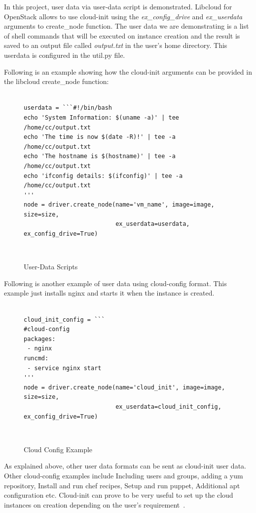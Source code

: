 In this project, user data via user-data script is demonstrated. Libcloud for
OpenStack allows to use cloud-init using the \textit{ex\_config\_drive} and
\textit{ex\_userdata} arguments to create\_node function. The user data we are
demonstrating is a list of shell commands that will be executed on instance
creation and the result is saved to an output file called \textit{output.txt} 
in the user's home directory. This userdata is configured in the util.py file.

Following is an example showing how the cloud-init arguments can be provided 
in the libcloud create\_node function:

\begin{figure}[htb]
\begin{verbatim}

userdata = ```#!/bin/bash
echo 'System Information: $(uname -a)' | tee /home/cc/output.txt
echo 'The time is now $(date -R)!' | tee -a /home/cc/output.txt
echo 'The hostname is $(hostname)' | tee -a /home/cc/output.txt
echo 'ifconfig details: $(ifconfig)' | tee -a /home/cc/output.txt
'''
node = driver.create_node(name='vm_name', image=image, size=size,
                          ex_userdata=userdata, ex_config_drive=True)
\end{verbatim}
\caption{User-Data Scripts}
~\cite{hid-sp18-516-www-cloud-init}\label{c:cloud-init-example1}
\end{figure}

Following is another example of user data using cloud-config format. This
example just installs nginx and starts it when the instance is created.

\begin{figure}[htb]
\begin{verbatim}

cloud_init_config = ```
#cloud-config
packages:
 - nginx
runcmd:
 - service nginx start
'''
node = driver.create_node(name='cloud_init', image=image, size=size,
                          ex_userdata=cloud_init_config, ex_config_drive=True)
\end{verbatim}
\caption{Cloud Config Example}
~\cite{hid-sp18-516-www-libcloud-functions}\label{c:cloud-init-example2}
\end{figure}

As explained above, other user data formats can be sent as cloud-init user 
data. Other cloud-config examples include Including users and groups, adding 
a yum repository, Install and run chef recipes, Setup and run puppet, 
Additional apt configuration etc. Cloud-init can prove to be very useful to 
set up the cloud instances on creation depending on the user's
requirement~\cite{hid-sp18-516-www-cloud-init}.

